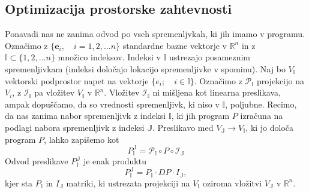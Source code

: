 \documentclass{article}
\newcommand{\RR}{\mathbb{R}}
\newcommand{\II}{\mathbb{I}}
\newcommand{\JJ}{\mathbb{J}}
\newcommand{\e}{\mathbf{e}}
\begin{document}
\subsection{Optimizacija prostorske zahtevnosti}
 Ponavadi nas ne zanima odvod po vseh spremenljvkah, ki jih imamo v programu.
 Označimo z $\{\e_i,\quad i=1,2,\ldots n\}$ standardne bazne vektorje v $\RR^n$ in z
 $\II\subset\{1,2,\ldots n\}$ množico indeksov. Indeksi v $\II$ ustrezajo
 posameznim spremenljivkam (indeksi določajo lokacijo spremenljivke v spominu). Naj bo $V_\II$ vektorski
 podprostor napet na vektorje $\{e_i;\quad i\in\II\}$. Označimo z 
 $\mathcal{P}_\II$ projekcijo na $V_i$, z $\mathcal{I}_\II$ pa vložitev $V_\II$ v
 $\RR^n$. Vložitev $\mathcal{I}_\II$ ni mišljena kot linearna preslikava, ampak
 dopuščamo, da so vrednosti spremenljivk, ki niso v $\II$, poljubne. Recimo, da nas zanima nabor spremenljivk z indeksi $\II$, ki jih
 program $P$ izračuna na podlagi nabora spremenljivk z indeksi $\mathbb{J}$.
 Preslikavo med $V_\JJ\to V_\II$, ki jo določa program $P$, lahko zapišemo kot
 \begin{equation}
   \label{eq:zozitev}
   P^{\JJ}_{\II}=\mathcal{P}_\II\circ P\circ \mathcal{I}_\JJ 
 \end{equation}
 Odvod preslikave $ P^{\JJ}_{\II}$ je enak produktu
 \begin{equation*}
   P^{\JJ}_{\II}=P_\II\cdot DP\cdot I_\JJ,   
 \end{equation*}
 kjer sta $P_\II$ in  $I_\JJ$ matriki, ki ustrezata projekciji na $V_\II$ oziroma
 vložitvi $V_\JJ$ v $\RR^n$.  
   
\end{document}
